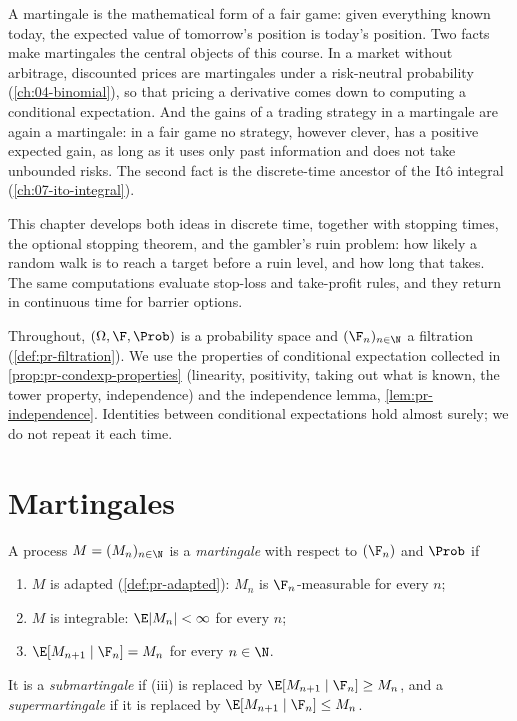 
A martingale is the mathematical form of a fair game: given everything known today, the
expected value of tomorrow's position is today's position. Two facts make martingales the
central objects of this course. In a market without arbitrage, discounted prices are
martingales under a risk-neutral probability (\cref{ch:04-binomial}), so that pricing a
derivative comes down to computing a conditional expectation. And the gains of a trading
strategy in a martingale are again a martingale: in a fair game no strategy, however
clever, has a positive expected gain, as long as it uses only past information and does not
take unbounded risks. The second fact is the discrete-time ancestor of the It\^o integral
(\cref{ch:07-ito-integral}).

This chapter develops both ideas in discrete time, together with stopping times, the
optional stopping theorem, and the gambler's ruin problem: how likely a random walk is to
reach a target before a ruin level, and how long that takes. The same computations evaluate
stop-loss and take-profit rules, and they return in continuous time for barrier options.

Throughout, $(\Omega,\F,\Prob)$ is a probability space and $(\F_n)_{n\in\N}$ a filtration
(\cref{def:pr-filtration}). We use the properties of conditional expectation collected in
\cref{prop:pr-condexp-properties} (linearity, positivity, taking out what is known, the tower
property, independence) and the independence lemma, \cref{lem:pr-independence}. Identities
between conditional expectations hold almost surely; we do not repeat it each time.

\section{Martingales}\label{sec:mg-martingales}

\begin{definition}[Martingale]\label{def:mg-martingale}
A process $M=(M_n)_{n\in\N}$ is a \emph{martingale} with respect to $(\F_n)$ and $\Prob$ if
\begin{enumerate}[label=(\roman*)]
  \item $M$ is adapted (\cref{def:pr-adapted}): $M_n$ is $\F_n$-measurable for every $n$;
  \item $M$ is integrable: $\E|M_n|<\infty$ for every $n$;
  \item $\E[M_{n+1}\mid\F_n]=M_n$ for every $n\in\N$.
\end{enumerate}
It is a \emph{submartingale} if (iii) is replaced by $\E[M_{n+1}\mid\F_n]\ge M_n$, and a
\emph{supermartingale} if it is replaced by $\E[M_{n+1}\mid\F_n]\le M_n$.
\end{definition}

